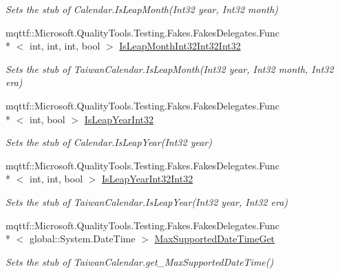 \begin{DoxyCompactItemize}
\begin{DoxyCompactList}\small\item\em Sets the stub of Calendar.\-Is\-Leap\-Month(\-Int32 year, Int32 month)\end{DoxyCompactList}\item 
mqttf\-::\-Microsoft.\-Quality\-Tools.\-Testing.\-Fakes.\-Fakes\-Delegates.\-Func\\*
$<$ int, int, int, bool $>$ \hyperlink{class_system_1_1_globalization_1_1_fakes_1_1_stub_taiwan_calendar_a511cf1a1b0505b5d66fef464aadb6fc3}{Is\-Leap\-Month\-Int32\-Int32\-Int32}
\begin{DoxyCompactList}\small\item\em Sets the stub of Taiwan\-Calendar.\-Is\-Leap\-Month(\-Int32 year, Int32 month, Int32 era)\end{DoxyCompactList}\item 
mqttf\-::\-Microsoft.\-Quality\-Tools.\-Testing.\-Fakes.\-Fakes\-Delegates.\-Func\\*
$<$ int, bool $>$ \hyperlink{class_system_1_1_globalization_1_1_fakes_1_1_stub_taiwan_calendar_a4c519621ba71a48d6db12aba568f3868}{Is\-Leap\-Year\-Int32}
\begin{DoxyCompactList}\small\item\em Sets the stub of Calendar.\-Is\-Leap\-Year(\-Int32 year)\end{DoxyCompactList}\item 
mqttf\-::\-Microsoft.\-Quality\-Tools.\-Testing.\-Fakes.\-Fakes\-Delegates.\-Func\\*
$<$ int, int, bool $>$ \hyperlink{class_system_1_1_globalization_1_1_fakes_1_1_stub_taiwan_calendar_a1d221212a3990cab12626cabc015a9cf}{Is\-Leap\-Year\-Int32\-Int32}
\begin{DoxyCompactList}\small\item\em Sets the stub of Taiwan\-Calendar.\-Is\-Leap\-Year(\-Int32 year, Int32 era)\end{DoxyCompactList}\item 
mqttf\-::\-Microsoft.\-Quality\-Tools.\-Testing.\-Fakes.\-Fakes\-Delegates.\-Func\\*
$<$ global\-::\-System.\-Date\-Time $>$ \hyperlink{class_system_1_1_globalization_1_1_fakes_1_1_stub_taiwan_calendar_a0839233bd4eb93f855b54f39535b9e85}{Max\-Supported\-Date\-Time\-Get}
\begin{DoxyCompactList}\small\item\em Sets the stub of Taiwan\-Calendar.\-get\-\_\-\-Max\-Supported\-Date\-Time()\end{DoxyCompactList}\item 

\end{DoxyCompactItemize}
